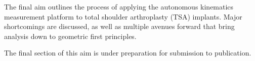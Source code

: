 The final aim outlines the process of applying the autonomous kinematics measurement platform to total shoulder arthroplasty (TSA) implants.
Major shortcomings are discussed, as well as multiple avenues forward that bring analysis down to geometric first principles.

The final section of this aim is under preparation for submission to publication.

